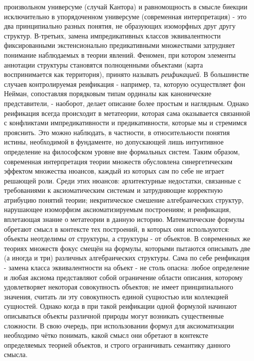 \documentclass[12pt]{article}
\begin{document}
произвольном универсуме (случай Кантора) и равномощность в смысле биекции исключительно в упорядоченном универсуме (современная интерпретация) - это два принципиально разных понятия, не образующих изоморфных друг другу структур. В-третьих, замена импредикативных классов эквивалентности фиксированными экстенсионально предикативными множествами затрудняет понимание наблюдаемых в теории явлений. Феномен, при котором элементы аннотации структуры становятся полноценными объектами (карта воспринимается как территория), принято называть {\it реификацией}. В большинстве случаев контролируемая реификация - например, та, которую осуществляет фон Нейман, сопоставляя порядковым типам ординалы как канонические представители, - наоборот, делает описание более простым и наглядным. Однако реификация всегда происходит в метатеории, которая сама оказывается связанной с конфликтами импредикативности и предикативности, которые мы и стремимся прояснить. Это можно наблюдать, в частности, в относительности понятия истины, необходимой в фундаменте, но допускающей лишь интуитивное определение на философском уровне вне формальных систем. Таким образом, современная интерпретация теории множеств обусловлена синергетическим эффектом множества нюансов, каждый из которых сам по себе не играет решающей роли. Среди этих нюансов: архитектурные недостатки, связанные с требованиями к аксиоматическим системам и затрудняющие корректную атрибуцию понятий теории; некритическое смешение алгебраических структур, нарушающее изоморфизм аксиоматизируемым построениям; и реификация, вплетающая знание о метатеории в данную историю. Математические формулы обретают смысл в контексте тех построений, в которых они используются: объекты неотделимы от структуры, а структуры - от объектов. В современных же теориях множеств фокус смещён на формулы, которыми пытаются описывать две (а иногда и три) различных алгебраических структуры. Сама по себе реификация - замена класса эквивалентности на объект - не столь опасна: любое определение и любая аксиома представляют собой ограничение области описания, которому удовлетворяет некоторая совокупность объектов; не имеет принципиального значения, считать ли эту совокупность единой сущностью или коллекцией сущностей. Однако когда в при такой реификации одной формулой начинают описываться объекты различной природы могут возникать существенные сложности. В свою очередь, при использовании формул для аксиоматизации необходимо чётко понимать, какой смысл они обретают в контексте определяемых теорией объектов, и строго ограничивать семантику данного смысла.
\end{document}
